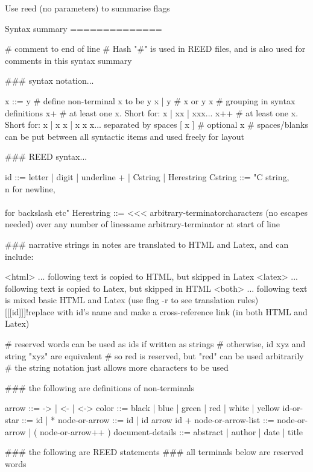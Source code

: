 Use reed (no parameters) to summarise flags

Syntax summary
==============

# comment to end of line
# Hash "#" is used in REED files, and is also used for comments in this syntax summary

### syntax notation...

x ::= y # define non-terminal x to be y
x | y   # x or y
{ x }   # grouping in syntax definitions
x+      # at least one x. Short for: x | xx | xxx...
x++     # at least one x. Short for: x | x x | x x x... separated by spaces
[ x ]   # optional x
        # spaces/blanks can be put between all syntactic items and used freely for layout 

### REED syntax...

id ::= { letter | digit | underline }+ | Cstring | Herestring
Cstring ::= "C string, \\n for newline, \\\\ for backslash etc" 
Herestring ::= <<< arbitrary-terminator\n                           characters (no escapes needed) over any number of lines\n                       same arbitrary-terminator at start of line

### narrative strings in notes are translated to HTML and Latex, and can include:

<html> ...  following text is copied to HTML, but skipped in Latex
<latex> ... following text is copied to Latex, but skipped in HTML
<both> ...  following text is mixed basic HTML and Latex (use flag -r to see translation rules)
[[[id]]]!replace with id's name and make a cross-reference link (in both HTML and Latex)

# reserved words can be used as ids if written as strings
# otherwise, id xyz and string "xyz" are equivalent
# so red is reserved, but "red" can be used arbitrarily
# the string notation just allows more characters to be used

### the following are definitions of non-terminals

arrow ::= -> | <- | <->
color ::= black | blue | green | red | white | yellow
id-or-star ::= id | *
node-or-arrow ::= id | id { arrow id }+
node-or-arrow-list ::= node-or-arrow | ( node-or-arrow++ )
document-details ::= abstract | author | date | title

### the following are REED statements
### all terminals below are reserved words

